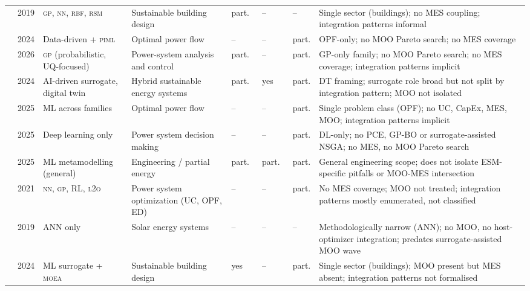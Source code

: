 \begin{table}[!t]
\begin{tabularx}{\textwidth}{@{}L{0.10\textwidth} L{0.04\textwidth} L{0.16\textwidth} L{0.18\textwidth} C{0.04\textwidth} C{0.04\textwidth} C{0.04\textwidth} L{0.30\textwidth}@{}}
    \cite{Westermann2019}
      & 2019
      & \textsc{gp}, \textsc{nn}, \textsc{rbf}, \textsc{rsm}
      & Sustainable building design
      & part.\ & -- & --
      & Single sector (buildings); no MES coupling; integration patterns informal \\
    \cite{Mohammadi2024}
      & 2024
      & Data-driven + \textsc{piml}
      & Optimal power flow
      & -- & -- & part.
      & OPF-only; no MOO Pareto search; no MES coverage \\
    \cite{Tan2026}
      & 2026
      & \textsc{gp} (probabilistic, UQ-focused)
      & Power-system analysis and control
      & part.\ & -- & part.
      & GP-only family; no MOO Pareto search; no MES coverage; integration patterns implicit \\
    \cite{Khan2024_DT}
      & 2024
      & AI-driven surrogate, digital twin
      & Hybrid sustainable energy systems
      & part.\ & yes & part.
      & DT framing; surrogate role broad but not split by integration pattern; MOO not isolated \\
    \cite{Khaloie2025}
      & 2025
      & ML across families
      & Optimal power flow
      & -- & -- & part.
      & Single problem class (OPF); no UC, CapEx, MES, MOO; integration patterns implicit \\
    \cite{Lim2025}
      & 2025
      & Deep learning only
      & Power system decision making
      & -- & -- & part.
      & DL-only; no PCE, GP-BO or surrogate-assisted NSGA; no MES, no MOO Pareto search \\
    \cite{Starke2025214}
      & 2025
      & ML metamodelling (general)
      & Engineering / partial energy
      & part.\ & part.\ & part.
      & General engineering scope; does not isolate ESM-specific pitfalls or MOO-MES intersection \\
    \cite{Ruan2021221}
      & 2021
      & \textsc{nn}, \textsc{gp}, RL, \textsc{l2o}
      & Power system optimization (UC, OPF, ED)
      & -- & -- & part.
      & No MES coverage; MOO not treated; integration patterns mostly enumerated, not classified \\
    \cite{Elsheikh2019622}
      & 2019
      & ANN only
      & Solar energy systems
      & -- & -- & --
      & Methodologically narrow (ANN); no MOO, no host-optimizer integration; predates surrogate-assisted MOO wave \\
    \cite{Elwy2024}
      & 2024
      & ML surrogate + \textsc{moea}
      & Sustainable building design
      & yes & -- & part.
      & Single sector (buildings); MOO present but MES absent; integration patterns not formalised \\

\end{tabularx}
\end{table}
